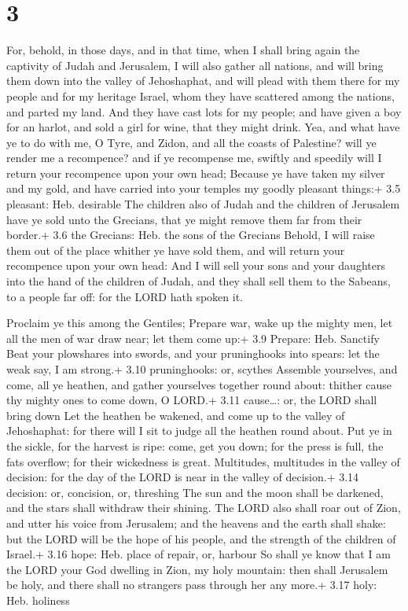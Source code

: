 \hypertarget{section-2}{%
\section{3}\label{section-2}}

 For, behold, in those days, and in that time, when I shall
bring again the captivity of Judah and Jerusalem,  I will
also gather all nations, and will bring them down into the valley of
Jehoshaphat, and will plead with them there for my people and for my
heritage Israel, whom they have scattered among the nations, and parted
my land.  And they have cast lots for my people; and have
given a boy for an harlot, and sold a girl for wine, that they might
drink.  Yea, and what have ye to do with me, O Tyre, and
Zidon, and all the coasts of Palestine? will ye render me a recompence?
and if ye recompense me, swiftly and speedily will I return your
recompence upon your own head;  Because ye have taken my
silver and my gold, and have carried into your temples my goodly
pleasant things:+ 3.5 pleasant: Heb. desirable  The children
also of Judah and the children of Jerusalem have ye sold unto the
Grecians, that ye might remove them far from their border.+ 3.6 the
Grecians: Heb. the sons of the Grecians  Behold, I will
raise them out of the place whither ye have sold them, and will return
your recompence upon your own head:  And I will sell your
sons and your daughters into the hand of the children of Judah, and they
shall sell them to the Sabeans, to a people far off: for the LORD hath
spoken it.

 Proclaim ye this among the Gentiles; Prepare war, wake up
the mighty men, let all the men of war draw near; let them come up:+ 3.9
Prepare: Heb. Sanctify  Beat your plowshares into swords,
and your pruninghooks into spears: let the weak say, I am strong.+ 3.10
pruninghooks: or, scythes  Assemble yourselves, and come,
all ye heathen, and gather yourselves together round about: thither
cause thy mighty ones to come down, O LORD.+ 3.11 cause\ldots: or, the
LORD shall bring down  Let the heathen be wakened, and come
up to the valley of Jehoshaphat: for there will I sit to judge all the
heathen round about.  Put ye in the sickle, for the harvest
is ripe: come, get you down; for the press is full, the fats overflow;
for their wickedness is great.  Multitudes, multitudes in
the valley of decision: for the day of the LORD is near in the valley of
decision.+ 3.14 decision: or, concision, or, threshing  The
sun and the moon shall be darkened, and the stars shall withdraw their
shining.  The LORD also shall roar out of Zion, and utter
his voice from Jerusalem; and the heavens and the earth shall shake: but
the LORD will be the hope of his people, and the strength of the
children of Israel.+ 3.16 hope: Heb. place of repair, or, harbour
 So shall ye know that I am the LORD your God dwelling in
Zion, my holy mountain: then shall Jerusalem be holy, and there shall no
strangers pass through her any more.+ 3.17 holy: Heb. holiness

